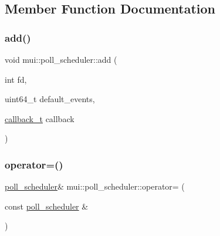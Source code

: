 \subsection{Member Function Documentation}
\mbox{\label{classmui_1_1poll__scheduler_afd46a617c8dc86e098570b20fc924101}} 
\subsubsection{\texorpdfstring{add()}{add()}}
{\footnotesize\ttfamily void mui\+::poll\+\_\+scheduler\+::add (\begin{DoxyParamCaption}\item[{int}]{fd,  }\item[{uint64\+\_\+t}]{default\+\_\+events,  }\item[{\hyperlink{classmui_1_1poll__scheduler_af5bd0cf1190776e89355d42aebb0a45f}{callback\+\_\+t}}]{callback }\end{DoxyParamCaption})\hspace{0.3cm}{\ttfamily [inline]}}

\mbox{\label{classmui_1_1poll__scheduler_a794c59cf98a5c087bf63e244dbf5e81b}} 
\subsubsection{\texorpdfstring{operator=()}{operator=()}}
{\footnotesize\ttfamily \hyperlink{classmui_1_1poll__scheduler}{poll\+\_\+scheduler}\& mui\+::poll\+\_\+scheduler\+::operator= (\begin{DoxyParamCaption}\item[{const \hyperlink{classmui_1_1poll__scheduler}{poll\+\_\+scheduler} \&}]{ }\end{DoxyParamCaption})\hspace{0.3cm}{\ttfamily [delete]}}

\mbox{\label{classmui_1_1poll__scheduler_a53e79c4a215767ccd5bead93395e1fae}} 
